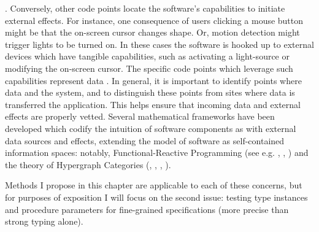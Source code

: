 {\begin{enumerate}
.
Conversely, other code points locate 
the software's capabilities to initiate external effects.  For 
instance, one consequence of users clicking a mouse button might 
be that the on-screen cursor changes shape.  Or, motion detection 
might trigger lights to be turned on.  In these cases the software 
is hooked up to external devices which have tangible capabilities, 
such as activating a light-source or modifying the on-screen cursor.  
The specific code points which leverage such capabilities 
represent data .  
In general, it is important to identify points where data 
 and  the system, and to distinguish 
these points from sites where data is transferred 
 the application.  This helps ensure that 
incoming data and external effects are properly vetted.  
Several mathematical frameworks have been developed 
which codify the intuition of software components as 
 with external data sources and effects, 
extending the model of software as self-contained 
information spaces: notably, Functional-Reactive Programming 
(see e.g. \cite{JenniferPaykin}, 
\cite{PaykinKrishnaswami}, 
\cite{WolfgangJeltsch}) and the theory of 
Hypergraph Categories 
(\cite{BobCoecke}, \cite{BrendanFong}, 
\cite{BrendanFongThesis}, \cite{AleksKissinger}). 
\end{enumerate}
Methods I propose in this chapter are applicable to each 
of these concerns, but for purposes of exposition I 
will focus on the second issue: testing 
type instances and procedure parameters for fine-grained 
specifications (more precise than strong typing alone). 
}
